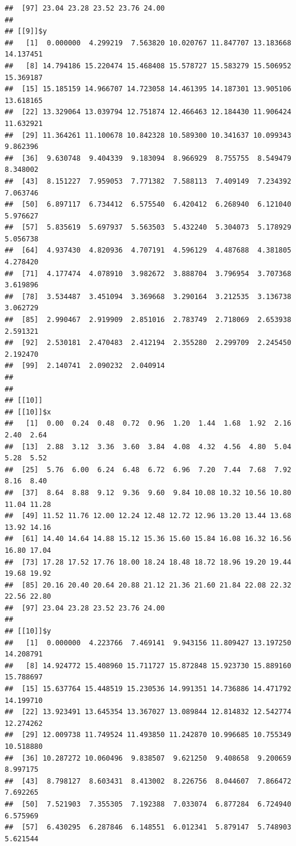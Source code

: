 \documentclass[
  ignorenonframetext,
]{beamer}
\begin{document}
\begin{frame}[fragile]{}
\begin{verbatim}
##  [97] 23.04 23.28 23.52 23.76 24.00
## 
## [[9]]$y
##   [1]  0.000000  4.299219  7.563820 10.020767 11.847707 13.183668 14.137451
##   [8] 14.794186 15.220474 15.468408 15.578727 15.583279 15.506952 15.369187
##  [15] 15.185159 14.966707 14.723058 14.461395 14.187301 13.905106 13.618165
##  [22] 13.329064 13.039794 12.751874 12.466463 12.184430 11.906424 11.632921
##  [29] 11.364261 11.100678 10.842328 10.589300 10.341637 10.099343  9.862396
##  [36]  9.630748  9.404339  9.183094  8.966929  8.755755  8.549479  8.348002
##  [43]  8.151227  7.959053  7.771382  7.588113  7.409149  7.234392  7.063746
##  [50]  6.897117  6.734412  6.575540  6.420412  6.268940  6.121040  5.976627
##  [57]  5.835619  5.697937  5.563503  5.432240  5.304073  5.178929  5.056738
##  [64]  4.937430  4.820936  4.707191  4.596129  4.487688  4.381805  4.278420
##  [71]  4.177474  4.078910  3.982672  3.888704  3.796954  3.707368  3.619896
##  [78]  3.534487  3.451094  3.369668  3.290164  3.212535  3.136738  3.062729
##  [85]  2.990467  2.919909  2.851016  2.783749  2.718069  2.653938  2.591321
##  [92]  2.530181  2.470483  2.412194  2.355280  2.299709  2.245450  2.192470
##  [99]  2.140741  2.090232  2.040914
## 
## 
## [[10]]
## [[10]]$x
##   [1]  0.00  0.24  0.48  0.72  0.96  1.20  1.44  1.68  1.92  2.16  2.40  2.64
##  [13]  2.88  3.12  3.36  3.60  3.84  4.08  4.32  4.56  4.80  5.04  5.28  5.52
##  [25]  5.76  6.00  6.24  6.48  6.72  6.96  7.20  7.44  7.68  7.92  8.16  8.40
##  [37]  8.64  8.88  9.12  9.36  9.60  9.84 10.08 10.32 10.56 10.80 11.04 11.28
##  [49] 11.52 11.76 12.00 12.24 12.48 12.72 12.96 13.20 13.44 13.68 13.92 14.16
##  [61] 14.40 14.64 14.88 15.12 15.36 15.60 15.84 16.08 16.32 16.56 16.80 17.04
##  [73] 17.28 17.52 17.76 18.00 18.24 18.48 18.72 18.96 19.20 19.44 19.68 19.92
##  [85] 20.16 20.40 20.64 20.88 21.12 21.36 21.60 21.84 22.08 22.32 22.56 22.80
##  [97] 23.04 23.28 23.52 23.76 24.00
## 
## [[10]]$y
##   [1]  0.000000  4.223766  7.469141  9.943156 11.809427 13.197250 14.208791
##   [8] 14.924772 15.408960 15.711727 15.872848 15.923730 15.889160 15.788697
##  [15] 15.637764 15.448519 15.230536 14.991351 14.736886 14.471792 14.199710
##  [22] 13.923491 13.645354 13.367027 13.089844 12.814832 12.542774 12.274262
##  [29] 12.009738 11.749524 11.493850 11.242870 10.996685 10.755349 10.518880
##  [36] 10.287272 10.060496  9.838507  9.621250  9.408658  9.200659  8.997175
##  [43]  8.798127  8.603431  8.413002  8.226756  8.044607  7.866472  7.692265
##  [50]  7.521903  7.355305  7.192388  7.033074  6.877284  6.724940  6.575969
##  [57]  6.430295  6.287846  6.148551  6.012341  5.879147  5.748903  5.621544

\end{verbatim}
\end{frame}
\end{document}
